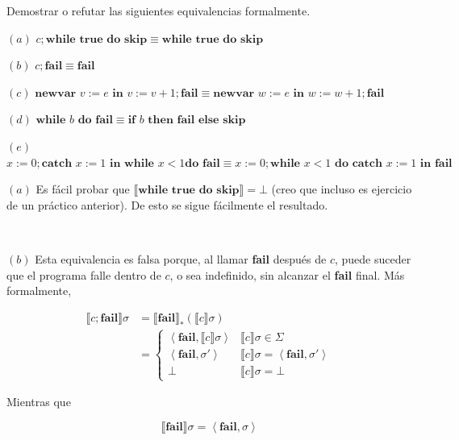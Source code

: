 \documentclass[article, 12pt]{article}
\begin{document}
\begin{myframe}
  Demostrar o refutar las siguientes equivalencias formalmente.

  $(a)$  $c;\textbf{while } \textbf{true} \textbf{ do } \textbf{skip} \equiv
  \textbf{while } \textbf{true} \textbf{ do } \textbf{skip}$

  $(b)$ $c;\textbf{fail} \equiv \textbf{fail}$

  $(c)$ $\textbf{newvar } v := e \textbf{ in } v := v+1;\textbf{fail} \equiv
  \textbf{newvar } w:=e \textbf{ in } w := w+ 1; \textbf{fail}$

  $(d)$ $\textbf{while } b \textbf{ do } \textbf{fail} \equiv \textbf{if } b
  \textbf{ then } \textbf{fail} \textbf{ else } \textbf{skip}$

  $(e)$ $x:=0;\textbf{catch } x := 1 \textbf{ in } \textbf{while } x<1 \textbf{
  do } \textbf{fail} \equiv x:=0 ; \textbf{while } x < 1 \textbf{ do catch } x :=
  1 \textbf{ in fail}$
\end{myframe}

$(a)$ Es fácil probar que 
$\llbracket \textbf{while } \textbf{true} \textbf{ do }\textbf{skip}
\rrbracket = \bot $ (creo que incluso es ejercicio de un práctico anterior). De
esto se sigue fácilmente el resultado.

~

$(b)$ Esta equivalencia es falsa porque, al llamar \textbf{fail} después de $c$,
puede suceder que el programa falle dentro de $c$, o sea indefinido, sin
alcanzar el \textbf{fail} final. Más formalmente,

\begin{align*}
  \llbracket c;\textbf{fail} \rrbracket\sigma
  &= \llbracket \textbf{fail} \rrbracket_{*}\left( \llbracket c \rrbracket\sigma
  \right) \\ 
  &=\begin{cases}
    \left<\textbf{fail}, \llbracket c \rrbracket\sigma \right> & \llbracket c
    \rrbracket\sigma \in \Sigma \\ 
    \left<\textbf{fail},\sigma' \right> & \llbracket c \rrbracket\sigma =
    \left<\textbf{fail}, \sigma' \right>\\
    \bot & \llbracket c \rrbracket\sigma = \bot 
  \end{cases}
\end{align*}

Mientras que 

\begin{equation*}
  \llbracket \textbf{fail} \rrbracket\sigma = \left<\textbf{fail}, \sigma\right>
\end{equation*}
\end{document}
